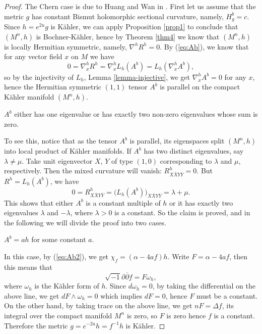\documentclass{amsart}
\numberwithin{equation}{section}
\begin{document}
\begin{proof}
The Chern case is due to Huang and Wan in \cite[Proposition 4.1]{HW}. First let us assume that the metric $g$ has constant Bismut holomorphic sectional curvature, namely, $H^b_g=c$. Since $h=e^{2u}g$ is K\"ahler, we can apply Proposition \ref{prop1} to conclude that $(M^n,h)$ is Bochner-K\"ahler, hence by Theorem \ref{thm4} we know that $(M^n,h)$ is locally Hermitian symmetric, namely, $\nabla^hR^h=0$.  By (\ref{eq:Ab}), we know that for any vector field $x$ on $M$ we have
$$ 0 = \nabla^h_xR^h = \nabla^h_xL_h(A^b) = L_h(\nabla^h_xA^b), $$
so by the injectivity of $L_h$, Lemma \ref{lemma-injective}, we get $\nabla^h_xA^b=0$ for any $x$, hence the Hermitian symmetric $(1,1)$ tensor $A^b$ is  parallel on the compact K\"ahler manifold $(M^n,h)$.

\vspace{0.1cm}

 $A^b$ either has one eigenvalue or has exactly two non-zero eigenvalues whose sum is zero.

\vspace{0.1cm}

To see this, notice that as the tensor $A^b$ is parallel, its eigenspaces split $(M^n,h)$ into local product of K\"ahler manifolds. If $A^b$ has two distinct eigenvalues, say $\lambda \neq \mu$. Take unit eigenvector $X$, $Y$ of type $(1,0)$ corresponding to $\lambda$ and $\mu$, respectively. Then the mixed curvature will vanish: $R^h_{X\overline{X}Y\overline{Y}}=0$. But $R^h=L_h(A^b)$, we have
$$ 0 = R^h_{X\overline{X}Y\overline{Y}} = \big(L_h(A^b)\big)_{X\overline{X}Y\overline{Y}} = \lambda + \mu.$$
This shows that either $A^b$ is a constant multiple of $h$ or it has exactly two eigenvalues $\lambda$ and $-\lambda$, where $\lambda >0$ is a constant. So the claim is proved, and in the following we will divide the proof into two cases.

\vspace{0.1cm}

 $A^b=ah$ for some constant $a$.

In this case, by (\ref{eq:Ab2}), we get $\chi_f = (\alpha -4af)h$. Write $F=\alpha-4af$, then this means that
$$ \sqrt{-1}\partial \overline{\partial } f = F \omega_h, $$
where $\omega_h$ is the K\"ahler form of $h$. Since $d\omega_h=0$, by taking the differential on the above line, we get $dF \wedge \omega_h=0$ which implies $dF=0$, hence $F$ must be a constant. On the other hand, by taking trace on the above line, we get $nF=\Delta f$, its integral over the compact manifold $M^n$ is zero, so $F$ is zero hence $f$ is a constant. Therefore the metric $g=e^{-2u}h=f^{-1}h$ is K\"ahler.


\end{proof}
\end{document}
